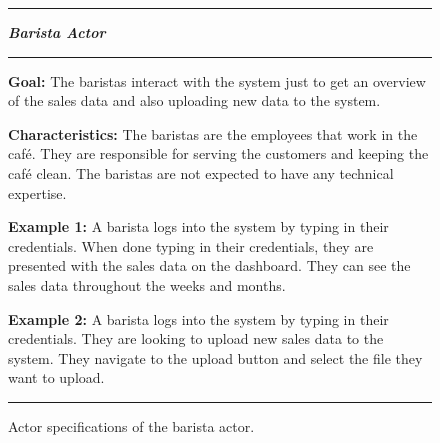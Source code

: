 \begin{figure}[H]
    \noindent
    \rule{\textwidth}{0.4pt}
    \begin{center}
    \noindent
    \textit{\textbf{Barista Actor}}
    \end{center}

    \noindent
    \rule{\textwidth}{0.4pt}

    \noindent
    \textbf{Goal:} The baristas interact with the system just to get an overview of the sales data and also uploading
    new data to the system.
    \newline

    \noindent
    \textbf{Characteristics:} The baristas are the employees that work in the café.
    They are responsible for serving the customers and keeping the café clean.
    The baristas are not expected to have any technical expertise.
    \newline

    \noindent
    \textbf{Example 1:} A barista logs into the system by typing in their credentials.
    When done typing in their credentials, they are presented with the sales data on the dashboard.
    They can see the sales data throughout the weeks and months.
    \newline

    \noindent
    \textbf{Example 2:} A barista logs into the system by typing in their credentials.
    They are looking to upload new sales data to the system.
    They navigate to the upload button and select the file they want to upload.

    \noindent
    \rule{\textwidth}{0.04pt}

    \caption{Actor specifications of the barista actor.
    }\label{fig:actor-barista}
\end{figure}

